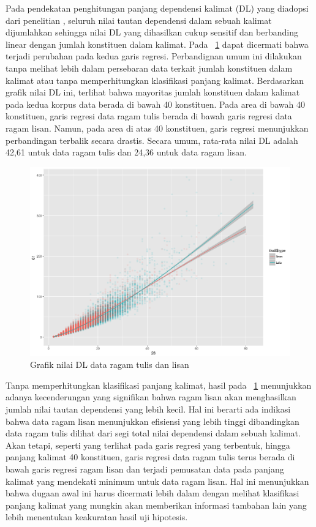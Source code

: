 Pada pendekatan penghitungan panjang dependensi kalimat (DL) yang diadopsi dari penelitian \cite{futrell2015large}, seluruh nilai tautan dependensi dalam sebuah kalimat dijumlahkan sehingga nilai DL yang dihasilkan cukup sensitif dan berbanding linear dengan jumlah konstituen dalam kalimat. Pada \pic~\ref{fig:lisantulis_DL} dapat dicermati bahwa terjadi perubahan pada kedua garis regresi. Perbandignan umum ini dilakukan tanpa melihat lebih dalam persebaran data terkait jumlah konstituen dalam kalimat atau tanpa memperhitungkan klasifikasi panjang kalimat. Berdasarkan grafik nilai DL ini, terlihat bahwa mayoritas jumlah konstituen dalam kalimat pada kedua korpus data berada di bawah 40 konstituen. Pada area di bawah 40 konstituen, garis regresi data ragam tulis berada di bawah garis regresi data ragam lisan. Namun, pada area di atas 40 konstituen, garis regresi menunjukkan perbandingan terbalik secara drastis. Secara umum, rata-rata nilai DL adalah 42,61 untuk data ragam tulis dan 24,36 untuk data ragam lisan. 

\begin{figure}
	\centering \includegraphics[width=1
	\textwidth] {pics/lisantulis_DL.png} 
	\caption{Grafik nilai DL data ragam tulis dan lisan} 
\label{fig:lisantulis_DL} 
\end{figure}

Tanpa memperhitungkan klasifikasi panjang kalimat, hasil pada \pic~\ref{fig:lisantulis_DL} menunjukkan adanya kecenderungan yang signifikan bahwa ragam lisan akan menghasilkan jumlah nilai tautan dependensi yang lebih kecil. Hal ini berarti ada indikasi bahwa data ragam lisan menunjukkan efisiensi yang lebih tinggi dibandingkan data ragam tulis dilihat dari segi total nilai dependensi dalam sebuah kalimat. Akan tetapi, seperti yang terlihat pada garis regresi yang terbentuk, hingga panjang kalimat 40 konstituen, garis regresi data ragam tulis terus berada di bawah garis regresi ragam lisan dan terjadi pemusatan data pada panjang kalimat yang mendekati minimum untuk data ragam lisan. Hal ini menunjukkan bahwa dugaan awal ini harus dicermati lebih dalam dengan melihat klasifikasi panjang kalimat yang mungkin akan memberikan informasi tambahan lain yang lebih menentukan keakuratan hasil uji hipotesis. 

